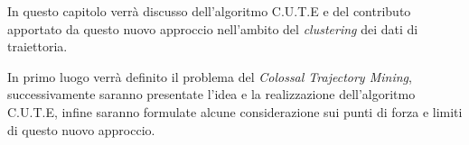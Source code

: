 In questo capitolo verrà discusso dell'algoritmo C.U.T.E e
del contributo apportato da questo nuovo approccio nell'ambito del \textit{clustering} dei dati di traiettoria.

In primo luogo verrà definito il problema del \textit{Colossal Trajectory Mining},
successivamente saranno presentate l'idea e la realizzazione dell'algoritmo C.U.T.E,
infine saranno formulate alcune considerazione sui punti di forza e limiti di questo nuovo approccio.
